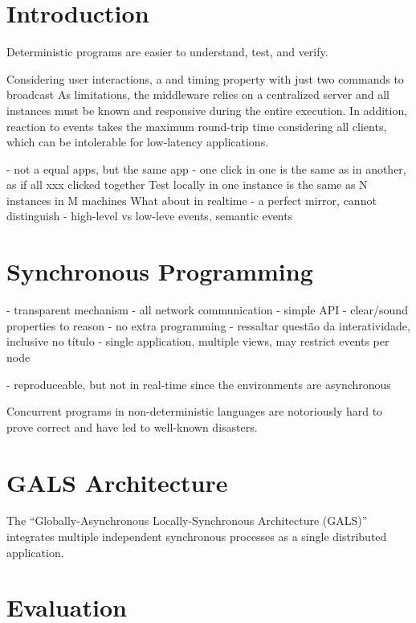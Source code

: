 \documentclass[sigplan,screen]{acmart}
\begin{document}
\section{Introduction}

Deterministic programs are easier to understand, test, and verify.

Considering user interactions, a
 and timing
 property
 with just two commands
 to broadcast
%
As limitations, the middleware relies on a centralized server and all instances
must be known and responsive during the entire execution.
In addition, reaction to events takes the maximum round-trip time considering
all clients, which can be intolerable for low-latency applications.

- not a equal apps, but the same app
    - one click in one is the same as in another, as if all xxx clicked together
Test locally in one instance is the same as N instances in M machines
What about in realtime
- a perfect mirror, cannot distinguish
- high-level vs low-leve events, semantic events


\section{Synchronous Programming}

- transparent mechanism
- all network communication
- simple API
- clear/sound properties to reason
- no extra programming
- ressaltar questão da interatividade, inclusive no título
  - single application, multiple views, may restrict events per node

- reproduceable, but not in real-time since the environments are asynchronous

Concurrent programs in non-deterministic languages are notoriously hard to prove correct and have led to well-known disasters.

\section{GALS Architecture}

The ``Globally-Asynchronous Locally-Synchronous Architecture (GALS)''
integrates multiple independent synchronous processes as a single distributed
application.

\section{Evaluation}
\end{document}
